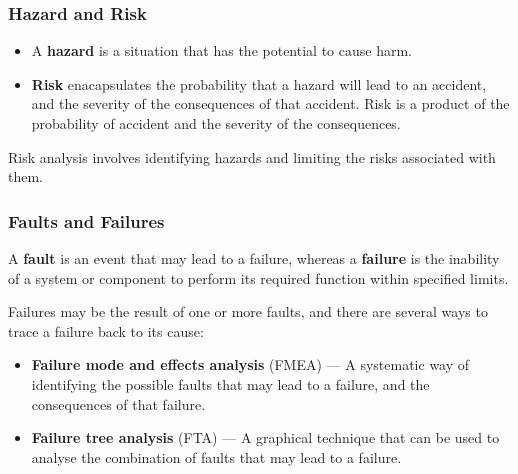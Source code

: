 \documentclass{article}
\begin{document}
\subsubsection{Hazard and Risk}
\begin{itemize}
    \item A \textbf{hazard} is a situation that has the potential to
          cause harm.
    \item \textbf{Risk} enacapsulates the probability that a hazard
          will lead to an accident, and the severity of the consequences
          of that accident. Risk is a product of the probability of
          accident and the severity of the consequences.
\end{itemize}
Risk analysis involves identifying hazards and limiting the risks
associated with them.
\subsubsection{Faults and Failures}
A \textbf{fault} is an event that may lead to a failure, whereas a
\textbf{failure} is the inability of a system or component to perform
its required function within specified limits.

Failures may be the result of one or more faults, and there are several
ways to trace a failure back to its cause:
\begin{itemize}
    \item \textbf{Failure mode and effects analysis} (FMEA) --- A
          systematic way of identifying the possible faults that may
          lead to a failure, and the consequences of that failure.
    \item \textbf{Failure tree analysis} (FTA) --- A graphical technique
          that can be used to analyse the combination of faults that may
          lead to a failure.
\end{itemize}
\end{document}
